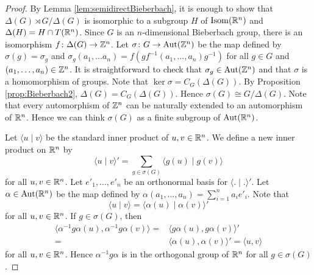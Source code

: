 \begin{proof} By Lemma \ref{lem:semidirectBieberbach}, it is enough to show that $\Delta(G)\rtimes G/\Delta(G)$ is isomorphic to a subgroup $H$ of $\operatorname{Isom}(\mathbb{R}^n)$ and $\Delta(H)=H\cap T(\mathbb{R}^n)$.
Since $G$ is an $n$-dimensional Bieberbach group, there is an isomorphism $f\colon \Delta(G)\to \mathbb{Z}^n$. Let $\sigma\colon G\to \operatorname{Aut}(\mathbb{Z}^n)$ be the map defined by $\sigma(g)=\sigma_g$ and $\sigma_g(a_1,\dots a_n)=f(gf^{-1}(a_1,\dots ,a_n)g^{-1})$ for all $g\in G$ and $(a_1,\dots ,a_n)\in\mathbb{Z}^n$. It is straightforward to check that $\sigma_g\in\operatorname{Aut}(\mathbb{Z}^n)$ and that $\sigma$ is a homomorphism of groups.
Note that $\ker\sigma=C_G(\Delta(G))$. By Proposition \ref{prop:Bieberbach2}, $\Delta(G)=C_G(\Delta(G))$. Hence $\sigma(G)\cong G/\Delta(G)$. Note that every automorphism of $\mathbb{Z}^n$ can be naturally extended to an automorphism of $\mathbb{R}^n$. Hence we can think $\sigma(G)$ as a finite subgroup of $\operatorname{Aut}(\mathbb{R}^n)$. 

Let $\langle u\mid v\rangle$ be the standard inner product of $u,v\in\mathbb{R}^n$. We define a new inner product on $\mathbb{R}^n$ by
\[ \langle u\mid v\rangle '=\sum_{g\in \sigma(G)}\langle g(u)\mid g(v)\rangle\]
for all $u,v\in\mathbb{R}^n$. Let $e'_1,\dots ,e'_n$ be an orthonormal basis for $\langle .\mid .\rangle '$. Let $\alpha\in \operatorname{Aut}(\mathbb{R}^n)$ be the map defined by $\alpha(a_1,\dots ,a_n)=\sum_{i=1}^na_ie'_i$. Note that
\[ \langle u\mid v\rangle=\langle \alpha (u)\mid \alpha (v)\rangle '\]
for all $u,v\in\mathbb{R}^n$. If $g\in \sigma(G)$, then
\begin{align*}
    \langle \alpha^{-1}g\alpha(u), \alpha^{-1}g\alpha(v)\rangle =&
    \langle g\alpha(u), g\alpha(v)\rangle '\\
    =&\langle \alpha(u), \alpha(v)\rangle '=\langle u, v\rangle 
\end{align*}
for all $u,v\in \mathbb{R}^n$. Hence $\alpha^{-1}g\alpha$ is in the orthogonal group of $\mathbb{R}^n$ for all $g\in \sigma(G)$.


\end{proof}
